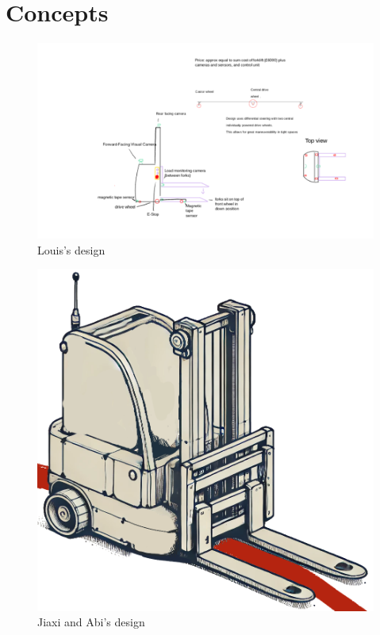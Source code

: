 \documentclass[12pt]{article}
\begin{document}
 

 
 
    \section{Concepts}
     

\begin{figure}[h!]
    \centering
     \includegraphics[width=1\textwidth]{Louis's design.png}
        \caption{Louis's design}
         \label{fig:Louis's design}
\end{figure}

\begin{figure}[h!]
    \centering
     \includegraphics[width=1\textwidth]{Simple_sketch_of_an_automated_forklift_robot_with_two_wheels_at_the_back_and_one_wheel_in_the_front.png}
        \caption{Jiaxi and Abi's design}
         \label{fig:three wheel line flowing}
\end{figure}
\end{document}
